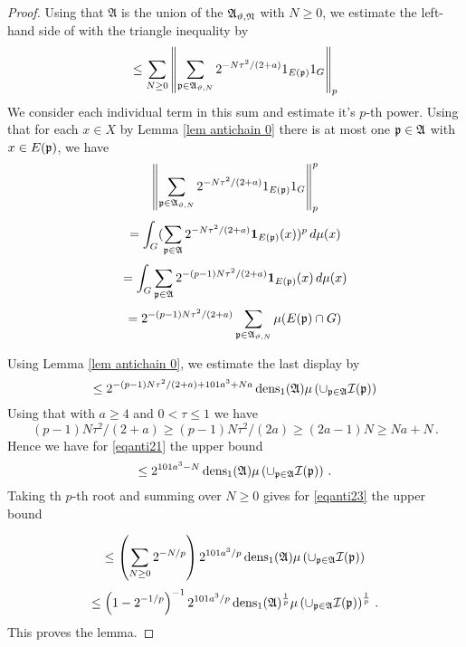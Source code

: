 \begin{proof}


Using that $\mathfrak{A}$ is the union of the
$\mathfrak{A_{\vartheta,N}}$ with $N\ge 0$,
we estimate the left-hand side of
with the triangle inequality by
\begin{equation}\label{eqanti23}
\le \sum_{N\ge 0} \left\|\sum_{\mathfrak p\in \mathfrak{A}_{\vartheta,N}} 2^{-N\tau^2/(2+a)}1_{E(\mathfrak p)} 1_G\right\|_{p}
\end{equation}
We consider each individual term in this sum and estimate it's $p$-th power.
   Using that for each $x\in X$  by Lemma \ref{lem antichain 0} there is at most one $\mathfrak p\in \mathfrak{A}$ with $x\in E(\mathfrak p)$,
 we have
 \begin{equation}
     \left\|\sum_{\mathfrak p\in \mathfrak{A}_{\vartheta,N}} 2^{-N\tau^2/(2+a)}1_{E(\mathfrak p)} 1_G\right\|_{p}^p
 \end{equation}
\begin{equation}
    =\int_G(\sum_{\mathfrak p\in\mathfrak{A}}2^{-N\tau^2/(2+a)}\mathbf{1}_{E(\mathfrak p)}(x))^p\, d\mu(x)
\end{equation}
\begin{equation}
  =   \int _G\sum_{\mathfrak p\in\mathfrak{A}}2^{-(p-1)N\tau^2/(2+a)}\mathbf{1}_{E(\mathfrak p)}(x)\, d\mu(x)
\end{equation}
\begin{equation}
  =   2^{-(p-1)N\tau^2/(2+a)} \sum_{\mathfrak p\in\mathfrak{A}_{\vartheta,N}}\mu(E(\mathfrak p)\cap G)
\end{equation}

Using Lemma \ref{lem antichain 0}, we estimate the last display by
\begin{equation}\label{eqanti21}
\le  2^{-(p-1)N\tau^2/(2+a)+101a^3+Na}\operatorname{\operatorname{dens}}_1(\mathfrak{A})\mu\left(\cup_{\mathfrak p\in\mathfrak{A}}\mathcal{I}(\mathfrak p)\right)
\end{equation}
Using that with $a\ge 4$ and $0<\tau\le 1$ we have
\begin{equation}
(p-1)N\tau^2/(2+a)\ge
(p-1)N\tau^2/(2a)\ge (2a -1)N\ge Na+N\, .
\end{equation}
Hence we have for \eqref{eqanti21} the upper bound
\begin{equation}\label{eqanti22}
\le  2^{101a^3-N}\operatorname{\operatorname{dens}}_1(\mathfrak{A})\mu\left(\cup_{\mathfrak p\in\mathfrak{A}}\mathcal{I}(\mathfrak p)\right)\, .
\end{equation}
Taking th $p$-th root and summing over $N\ge 0$ gives for \eqref{eqanti23} the upper bound

\begin{equation}
\le \left(\sum_{N\ge 0} 2^{-N/p}\right)2^{101a^3/p}\operatorname{\operatorname{dens}}_1(\mathfrak{A})\mu\left(\cup_{\mathfrak p\in\mathfrak{A}}\mathcal{I}(\mathfrak p)\right)
\end{equation}
\begin{equation}
\le \left(1-2^{-1/p}\right)^{-1}
2^{101a^3/p}
\operatorname{\operatorname{dens}}_1(\mathfrak{A})^{\frac 1p}\mu\left(\cup_{\mathfrak p\in\mathfrak{A}}\mathcal{I}(\mathfrak p)\right)^{\frac 1p}\, .
\end{equation}
This proves the lemma.
\end{proof}







